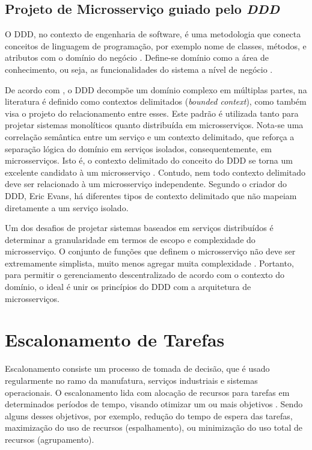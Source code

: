 \subsection{Projeto de Microsserviço guiado pelo \textit{DDD}}
O \ac{DDD}, no contexto de engenharia de software, é uma metodologia que conecta conceitos de linguagem de programação, por exemplo nome de classes, métodos, e atributos com o domínio do negócio \cite{DDD}. Define-se domínio como a área de conhecimento, ou seja, as funcionalidades do sistema a nível de negócio \cite{evans2014domain}.

De acordo com , o \ac{DDD} decompõe um domínio complexo em múltiplas partes, na literatura é definido como contextos delimitados (\textit{bounded context}), como também visa o projeto do relacionamento entre esses. Este padrão é utilizada tanto para projetar sistemas monolíticos quanto distribuída em microsserviços. Nota-se uma correlação semântica entre um serviço e um contexto delimitado, que reforça a separação lógica do domínio em serviços isolados, consequentemente, em microsserviços. Isto é, o contexto delimitado do conceito do \ac{DDD} se torna um excelente candidato à um microsserviço \cite{newman2015building}. Contudo, nem todo contexto delimitado deve ser relacionado à um microsserviço independente. Segundo o criador do \ac{DDD}, Eric Evans, há diferentes tipos de contexto delimitado que não mapeiam diretamente a um serviço isolado.

Um dos desafios de projetar sistemas baseados em serviços distribuídos é determinar a granularidade em termos de escopo e complexidade do microsserviço. O conjunto de funções que definem o microsserviço não deve ser extremamente simplista, muito menos agregar muita complexidade \cite{merson2020modeling}. Portanto, para permitir o gerenciamento descentralizado de acordo com o contexto do domínio, o ideal é unir os princípios do \ac{DDD} com a arquitetura de microsserviços.

\section{Escalonamento de Tarefas}

Escalonamento consiste um processo de tomada de decisão, que é usado regularmente no ramo da manufatura, serviços industriais e sistemas operacionais. O escalonamento lida com alocação de recursos para tarefas em determinados períodos de tempo, visando otimizar um ou mais objetivos \cite{pinedo2012scheduling}. Sendo alguns desses objetivos, por exemplo, redução do tempo de espera das tarefas, maximização do uso de recursos (espalhamento), ou minimização do uso total de recursos (agrupamento).

